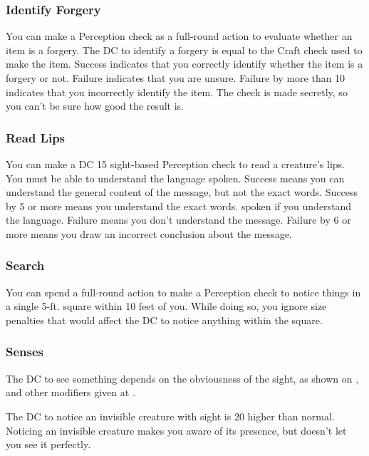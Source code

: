 \subsubsection{Identify Forgery}
You can make a Perception check as a full-round action to evaluate whether an item is a forgery. The DC to identify a forgery is equal to the Craft check used to make the item. Success indicates that you correctly identify whether the item is a forgery or not. Failure indicates that you are unsure. Failure by more than 10 indicates that you incorrectly identify the item. The check is made secretly, so you can't be sure how good the result is.

\subsubsection{Read Lips}
You can make a DC 15 sight-based Perception check to read a creature's lips. You must be able to understand the language spoken. Success means you can understand the general content of the message, but not the exact words. Success by 5 or more means you understand the exact words. spoken if you understand the language. Failure means you don't understand the message. Failure by 6 or more means you draw an incorrect conclusion about the message.

\subsubsection{Search}
You can spend a full-round action to make a Perception check to notice things in a single 5-ft. square within 10 feet of you. While doing so, you ignore size penalties that would affect the DC to notice anything within the square.

\subsubsection{Senses}

 The DC to see something depends on the obviousness of the sight, as shown on , and other modifiers given at .

The DC to notice an invisible creature with sight is 20 higher than normal. Noticing an invisible creature makes you aware of its presence, but doesn't let you see it perfectly.

